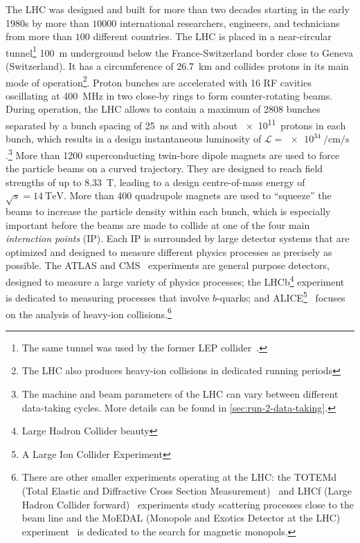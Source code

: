 The LHC was designed and built for more than two decades starting in the early 1980s by more than $10000$ international researchers, engineers, and technicians from more than $100$ different countries.
The LHC is placed in a near-circular tunnel\footnote{The same tunnel was used by the former LEP collider~\cite{LEPDesignReport}.} \SI{100}{\m} underground below the France-Switzerland border close to Geneva (Switzerland). It has a circumference of \SI{26.7}{\km} and collides protons in its main mode of operation\footnote{The LHC also produces heavy-ion collisions in dedicated running periods}. Proton bunches are accelerated with 16 RF cavities oscillating at \SI{400}{\mega\hertz} in two close-by rings to form counter-rotating beams. During operation, the LHC allows to contain a maximum of 2808 bunches separated by a bunch spacing of \SI{25}{\ns} and with about \SI{e11}{protons} in each bunch, which results in a design instantaneous luminosity of $\mathcal{L} = \SI{e34}{\per\cm\per\s}$.\footnote{The machine and beam parameters of the LHC can vary between different data-taking cycles. More details can be found in \cref{sec:run-2-data-taking}.}
More than 1200 superconducting twin-bore dipole magnets are used to force the particle beams on a curved trajectory.
They are designed to reach field strengths of up to \SI{8.33}{\tesla}, leading to a design centre-of-mass energy of $\sqrt{s} = \SI{14}{\TeV}$. More than 400 quadrupole magnets are used to ``squeeze'' the beams to increase the particle density within each bunch, which is especially important before the beams are made to collide at one of the four main \emph{interaction points} (IP). Each IP is surrounded by large detector systems that are optimized and designed to measure different physics processes as precisely as possible.
The ATLAS and CMS~\cite{CMS-TDR-08-001} experiments are general purpose detectors, designed to measure a large variety of physics processes; the LHCb\footnote{Large Hadron Collider beauty} experiment~\cite{1748-0221-3-08-S08005} is dedicated to measuring processes that involve $b$-quarks; and ALICE\footnote{A Large Ion Collider Experiment}~\cite{1748-0221-3-08-S08002} focuses on the analysis of heavy-ion collisions.\footnote{There are other smaller experiments operating at the LHC: the TOTEMd (Total Elastic and Diffractive Cross Section Measurement)~\cite{1748-0221-3-08-S08007} and LHCf (Large Hadron Collider forward)~\cite{1748-0221-3-08-S08006} experiments study scattering processes close to the beam line and the MoEDAL (Monopole and Exotics Detector at the LHC) experiment~\cite{1742-6596-631-1-012014} is dedicated to the search for magnetic monopols.}


